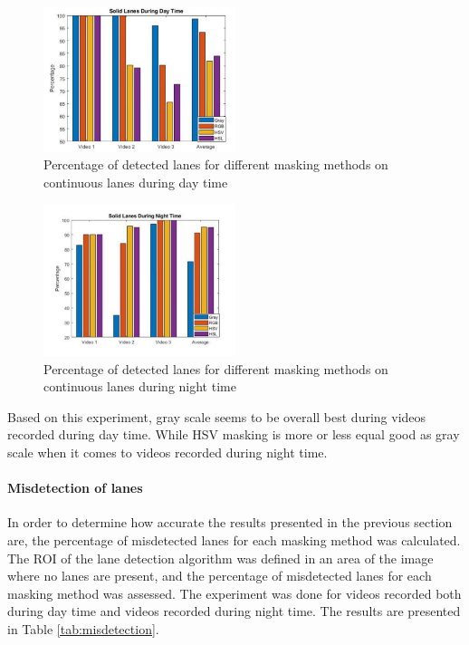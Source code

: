 \begin{figure}[H]
    \centering
    \includegraphics[width = 0.5\textwidth]{Figures/result_02.pdf}
    \caption{Percentage of detected lanes for different masking methods on continuous lanes during day time}
    \label{fig:solid_day}
\end{figure}

\begin{figure}[H]
    \centering
    \includegraphics[width = 0.5\textwidth]{Figures/result_03.pdf}
    \caption{Percentage of detected lanes for different masking methods on continuous lanes during night time}
    \label{fig:night}
\end{figure}

Based on this experiment, gray scale seems to be overall best during videos recorded during day time. While HSV masking is more or less equal good as gray scale when it comes to videos recorded during night time.

\paragraph{Misdetection of lanes}
In order to determine how accurate the results presented in the previous section are, the percentage of misdetected lanes for each masking method was calculated. The ROI of the lane detection algorithm was defined in an area of the image where no lanes are present, and the percentage of misdetected lanes for each masking method was assessed. The experiment was done for videos recorded both during day time and videos recorded during night time. The results are presented in Table \ref{tab:misdetection}.


